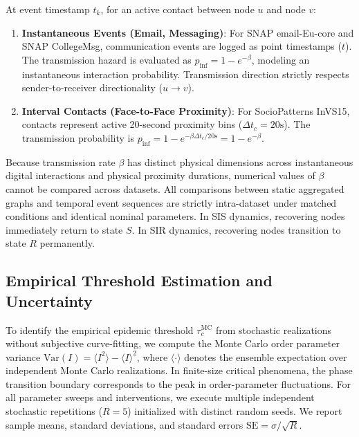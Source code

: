 \documentclass[conference]{IEEEtran}
\begin{document}
At event timestamp $t_k$, for an active contact between node $u$ and node $v$:
\begin{enumerate}
    \item \textbf{Instantaneous Events (Email, Messaging)}: For SNAP email-Eu-core and SNAP CollegeMsg, communication events are logged as point timestamps ($t$). The transmission hazard is evaluated as $p_{\text{inf}} = 1 - e^{-\beta}$, modeling an instantaneous interaction probability. Transmission direction strictly respects sender-to-receiver directionality ($u \to v$).
    \item \textbf{Interval Contacts (Face-to-Face Proximity)}: For SocioPatterns InVS15, contacts represent active 20-second proximity bins ($\Delta t_c = 20\text{s}$). The transmission probability is $p_{\text{inf}} = 1 - e^{-\beta \Delta t_c / 20\text{s}} = 1 - e^{-\beta}$.
\end{enumerate}
Because transmission rate $\beta$ has distinct physical dimensions across instantaneous digital interactions and physical proximity durations, numerical values of $\beta$ cannot be compared across datasets. All comparisons between static aggregated graphs and temporal event sequences are strictly intra-dataset under matched conditions and identical nominal parameters. In SIS dynamics, recovering nodes immediately return to state $S$. In SIR dynamics, recovering nodes transition to state $R$ permanently.

\subsection{Empirical Threshold Estimation and Uncertainty}
To identify the empirical epidemic threshold $\tau_c^{\text{MC}}$ from stochastic realizations without subjective curve-fitting, we compute the Monte Carlo order parameter variance $\text{Var}(I) = \langle I^2 \rangle - \langle I \rangle^2$, where $\langle \cdot \rangle$ denotes the ensemble expectation over independent Monte Carlo realizations. In finite-size critical phenomena, the phase transition boundary corresponds to the peak in order-parameter fluctuations. For all parameter sweeps and interventions, we execute multiple independent stochastic repetitions ($R=5$) initialized with distinct random seeds. We report sample means, standard deviations, and standard errors $\text{SE} = \sigma / \sqrt{R}$.
\end{document}
